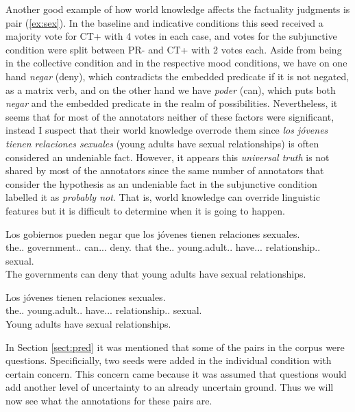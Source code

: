 Another good example of how world knowledge affects the factuality judgments is pair (\ref{ex:sex}). In the baseline and indicative conditions this seed received a majority vote for CT+ with 4 votes in each case, and votes for the subjunctive condition were split between PR- and CT+ with 2 votes each. Aside from being in the collective condition and in the respective mood conditions, we have on one hand \textit{negar} (deny), which contradicts the embedded predicate if it is not negated, as a matrix verb, and on the other hand we have \textit{poder} (can), which puts both \textit{negar} and the embedded predicate in the realm of possibilities. Nevertheless, it seems that for most of the annotators neither of these factors were significant, instead I suspect that their world knowledge overrode them since \textit{los jóvenes tienen relaciones sexuales} (young adults have sexual relationships) is often considered an undeniable fact. However, it appears this \textit{universal truth} is not shared by most of the annotators since the same number of annotators that consider the hypothesis as an undeniable fact in the subjunctive condition labelled it as \textit{probably not}. That is, world knowledge can override linguistic features but it is difficult to determine when it is going to happen.\\

\begin{exe}
  \ex\label{ex:sex}
    \begin{xlist}
      \item{\gll Los gobiernos pueden negar que los jóvenes tienen relaciones sexuales.\\ the.\M.\Pl{} government.\M.\Pl{} can.\Prs.\Ind.\Tpl{} deny.\Inf{} that the.\M.\Pl{} young.adult.\M.\Pl{} have.\Prs.\Ind.\Tpl{} relationship.\F.\Pl{} sexual.\Pl{} \\\glt The governments can deny that young adults have sexual relationships.}
      \item{\gll Los jóvenes tienen relaciones sexuales.\\ the.\M.\Pl{} young.adult.\M.\Pl{} have.\Prs.\Ind.\Tpl{} relationship.\F.\Pl{} sexual.\Pl{} \\\glt Young adults have sexual relationships.} \label{ex:hypsex}
    \end{xlist}
\end{exe}

In Section \ref{sect:pred} it was mentioned that some of the pairs in the corpus were questions. Specificially, two seeds were added in the individual condition with certain concern. This concern came because it was assumed that questions would add another level of uncertainty to an already uncertain ground. Thus we will now see what the annotations for these pairs are.\\ 

